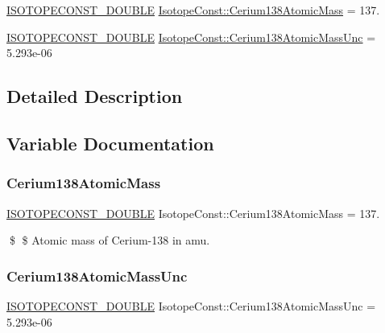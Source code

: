 \begin{DoxyCompactItemize}
\item 
\mbox{\hyperlink{group___isotope_const-_macros_ga8f45a7272ce02c0b4c65c44636ed719a}{I\+S\+O\+T\+O\+P\+E\+C\+O\+N\+S\+T\+\_\+\+D\+O\+U\+B\+LE}} \mbox{\hyperlink{group___isotope_const-_cerium-_ce138_ga135d4e2750d770e368fd4c41f0a4007b}{Isotope\+Const\+::\+Cerium138\+Atomic\+Mass}} = 137.
\item 
\mbox{\hyperlink{group___isotope_const-_macros_ga8f45a7272ce02c0b4c65c44636ed719a}{I\+S\+O\+T\+O\+P\+E\+C\+O\+N\+S\+T\+\_\+\+D\+O\+U\+B\+LE}} \mbox{\hyperlink{group___isotope_const-_cerium-_ce138_ga80a27a97a129617e825c72209533392d}{Isotope\+Const\+::\+Cerium138\+Atomic\+Mass\+Unc}} = 5.\+293e-\/06
\end{DoxyCompactItemize}


\subsection{Detailed Description}


\subsection{Variable Documentation}
\mbox{\label{group___isotope_const-_cerium-_ce138_ga135d4e2750d770e368fd4c41f0a4007b}} 
\subsubsection{\texorpdfstring{Cerium138\+Atomic\+Mass}{Cerium138AtomicMass}}
{\footnotesize\ttfamily \mbox{\hyperlink{group___isotope_const-_macros_ga8f45a7272ce02c0b4c65c44636ed719a}{I\+S\+O\+T\+O\+P\+E\+C\+O\+N\+S\+T\+\_\+\+D\+O\+U\+B\+LE}} Isotope\+Const\+::\+Cerium138\+Atomic\+Mass = 137.}

\$ \$ Atomic mass of Cerium-\/138 in amu. \mbox{\label{group___isotope_const-_cerium-_ce138_ga80a27a97a129617e825c72209533392d}} 
\subsubsection{\texorpdfstring{Cerium138\+Atomic\+Mass\+Unc}{Cerium138AtomicMassUnc}}
{\footnotesize\ttfamily \mbox{\hyperlink{group___isotope_const-_macros_ga8f45a7272ce02c0b4c65c44636ed719a}{I\+S\+O\+T\+O\+P\+E\+C\+O\+N\+S\+T\+\_\+\+D\+O\+U\+B\+LE}} Isotope\+Const\+::\+Cerium138\+Atomic\+Mass\+Unc = 5.\+293e-\/06}

